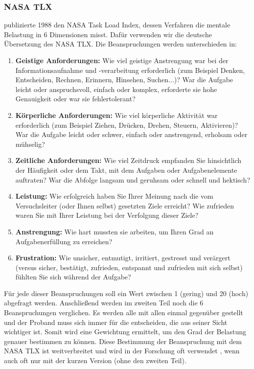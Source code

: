 \subsubsection{NASA TLX}
\citet{hart1988development} publizierte 1988 den NASA Task Load Index, dessen Verfahren die mentale Belastung in 6 Dimensionen misst. 
Dafür verwenden wir die deutsche Übersetzung des NASA TLX. 
Die Beanspruchungen werden unterschieden in: 
\begin{enumerate}
	\item \textbf{Geistige Anforderungen:} Wie viel geistige Anstrengung war bei der Informationsaufnahme und -verarbeitung erforderlich (zum Beispiel Denken, Entscheiden, Rechnen, Erinnern, Hinsehen, Suchen...)? 
War die Aufgabe leicht oder anspruchsvoll, einfach oder komplex, erforderte sie hohe Genauigkeit oder war sie fehlertolerant?
	\item \textbf{Körperliche Anforderungen:} Wie viel körperliche Aktivität war erforderlich (zum Beispiel Ziehen, Drücken, Drehen, Steuern, Aktivieren)? 
	War die Aufgabe leicht oder schwer, einfach oder anstrengend, erholsam oder mühselig?
	\item \textbf{Zeitliche Anforderungen:} Wie viel Zeitdruck empfanden Sie hinsichtlich der Häufigkeit oder dem Takt, mit dem Aufgaben oder Aufgabenelemente auftraten? War die Abfolge langsam und geruhsam oder schnell und hektisch?
	\item \textbf{Leistung:} Wie erfolgreich haben Sie Ihrer Meinung nach die vom Versuchsleiter (oder Ihnen selbst) gesetzten Ziele erreicht? Wie zufrieden waren Sie mit Ihrer Leistung bei der Verfolgung dieser Ziele?
	\item \textbf{Anstrengung:} Wie hart mussten sie arbeiten, um Ihren Grad an Aufgabenerfüllung zu erreichen?
	\item \textbf{Frustration:} Wie unsicher, entmutigt, irritiert, gestresst und verärgert (versus sicher, bestätigt, zufrieden, entspannt und zufrieden mit sich selbst) fühlten Sie sich während der Aufgabe?
\end{enumerate}
Für jede dieser Beanspruchungen soll ein Wert zwischen 1 (gering) und 20 (hoch) abgefragt werden. 
Anschließend werden im zweiten Teil noch die 6 Beanspruchungen verglichen. 
Es werden alle mit allen einmal gegenüber gestellt und der Proband muss sich immer für die entscheiden, die aus seiner Sicht wichtiger ist. 
Somit wird eine Gewichtung ermittelt, um den Grad der Belastung genauer bestimmen zu können. 
Diese Bestimmung der Beanspruchung mit dem NASA TLX ist weitverbreitet und wird in der Forschung oft verwendet \citep{hart2006nasa}, wenn auch oft nur mit der kurzen Version (ohne den zweiten Teil). 
